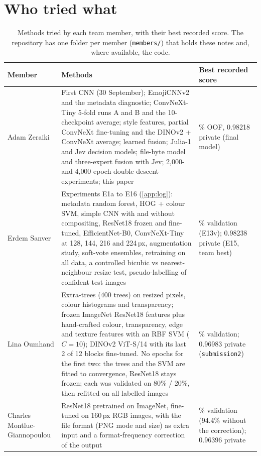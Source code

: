 \section{Who tried what}
\label{app:who}
\begin{table}[H]
\centering\small
\caption{Methods tried by each team member, with their best recorded score. The repository has one folder per member (\texttt{members/}) that holds these notes and, where available, the code.}
\begin{tabularx}{\textwidth}{@{}l>{\raggedright\arraybackslash}X>{\raggedright\arraybackslash}p{40mm}@{}}
\toprule
Member & Methods & Best recorded score\\
\midrule
Adam Zeraiki & First CNN (30 September); EmojiCNNv2 and the metadata diagnostic; ConvNeXt-Tiny 5-fold runs A and B and the 10-checkpoint average; style features, partial ConvNeXt fine-tuning and the DINOv2 + ConvNeXt average; learned fusion; Julia-1 and Jev decision models; file-byte model and three-expert fusion with Jev; 2{,}000- and 4{,}000-epoch double-descent experiments; this paper & 97.69\% OOF, 0.98218 private (final model)\\
Erdem Sanver & Experiments E1a to E16 (\cref{app:log}): metadata random forest, HOG + colour SVM, simple CNN with and without compositing, ResNet18 frozen and fine-tuned, EfficientNet-B0, ConvNeXt-Tiny at 128, 144, 216 and 224\,px, augmentation study, soft-vote ensembles, retraining on all data, a controlled bicubic vs nearest-neighbour resize test, pseudo-labelling of confident test images & 98.13\% validation (E13v); 0.98238 private (E15, team best)\\
Lina Oumhand & Extra-trees (400 trees) on resized pixels, colour histograms and transparency; frozen ImageNet ResNet18 features plus hand-crafted colour, transparency, edge and texture features with an RBF SVM ($C=10$); DINOv2 ViT-S/14 with its last 2 of 12 blocks fine-tuned. No epochs for the first two: the trees and the SVM are fitted to convergence, ResNet18 stays frozen; each was validated on 80\% / 20\%, then refitted on all labelled images & 96.76\% validation; 0.96983 private (\texttt{submission2})\\
Charles Montluc-Giannopoulou & ResNet18 pretrained on ImageNet, fine-tuned on 160\,px RGB images, with the file format (PNG mode and size) as extra input and a format-frequency correction of the output & 96.4\% validation (94.4\% without the correction); 0.96396 private\\
\bottomrule
\end{tabularx}
\end{table}
